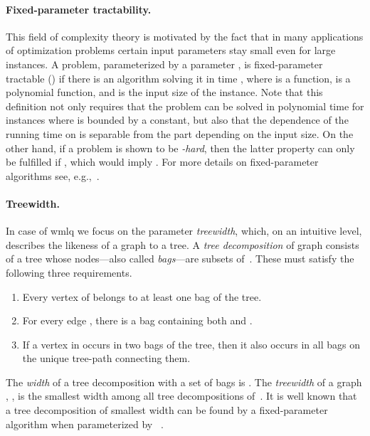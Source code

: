 \documentclass{llncs}
\begin{document}
\paragraph{Fixed-parameter tractability.}
This field of complexity theory is motivated by the fact that in many applications of optimization problems certain input parameters stay small even for large instances. 
A problem, parameterized by a parameter , is fixed-parameter tractable () if there is an algorithm solving it in time , where  is a function,  is a polynomial function, and  is the input size of the instance. Note that this definition not only requires that the problem can be solved in polynomial time for instances where  is bounded by a constant, but also that the dependence of the running time on  is separable from the part depending on the input size. On the other hand, if a problem is shown to be \emph{-hard}, then the latter property can only be fulfilled if , which would imply . For more details on fixed-parameter algorithms see, e.g.,~\cite{Nie06}.

\paragraph{Treewidth.}
In case of {\sc wmlq} we focus on the parameter \emph{treewidth}, which, on an intuitive level, describes the likeness of a graph to a tree.
A \emph{tree decomposition} of graph  consists of a tree whose nodes---also called \emph{bags}---are subsets of~. These must satisfy the following three requirements.
\begin{enumerate}
\item Every vertex of  belongs to at least one bag of the tree.
\item For every edge , there is a bag containing both  and .
\item If a vertex in  occurs in two bags of the tree, then it also occurs in all bags on the unique tree-path connecting them.
\end{enumerate}
The \emph{width} of a tree decomposition with a set of bags  is .
The \emph{treewidth} of a graph , , is the smallest width among all tree decompositions of~. It is well known that a tree decomposition of smallest width can be found by a fixed-parameter algorithm when parameterized by ~\cite{Bod96}.
\medskip
\end{document}
